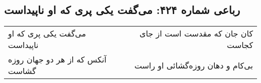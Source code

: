 \begin{center}
\section*{رباعی شماره ۴۲۴: می‌گفت یکی پری که او ناپیداست}
\label{sec:0424}
\begin{longtable}{l p{0.5cm} r}
می‌گفت یکی پری که او ناپیداست
&&
کان جان که مقدست است از جای کجاست
\\
آنکس که از هر دو جهان روزه گشاست
&&
بی‌کام و دهان روزه‌گشائی او راست
\\
\end{longtable}
\end{center}
